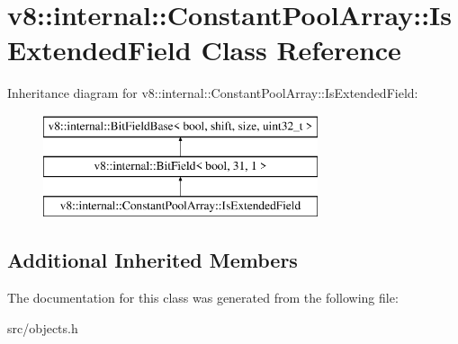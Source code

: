 \hypertarget{classv8_1_1internal_1_1_constant_pool_array_1_1_is_extended_field}{}\section{v8\+:\+:internal\+:\+:Constant\+Pool\+Array\+:\+:Is\+Extended\+Field Class Reference}
\label{classv8_1_1internal_1_1_constant_pool_array_1_1_is_extended_field}
Inheritance diagram for v8\+:\+:internal\+:\+:Constant\+Pool\+Array\+:\+:Is\+Extended\+Field\+:\begin{figure}[H]
\begin{center}
\leavevmode
\includegraphics[height=3.000000cm]{classv8_1_1internal_1_1_constant_pool_array_1_1_is_extended_field}
\end{center}
\end{figure}
\subsection*{Additional Inherited Members}


The documentation for this class was generated from the following file\+:\begin{DoxyCompactItemize}
\item 
src/objects.\+h\end{DoxyCompactItemize}
